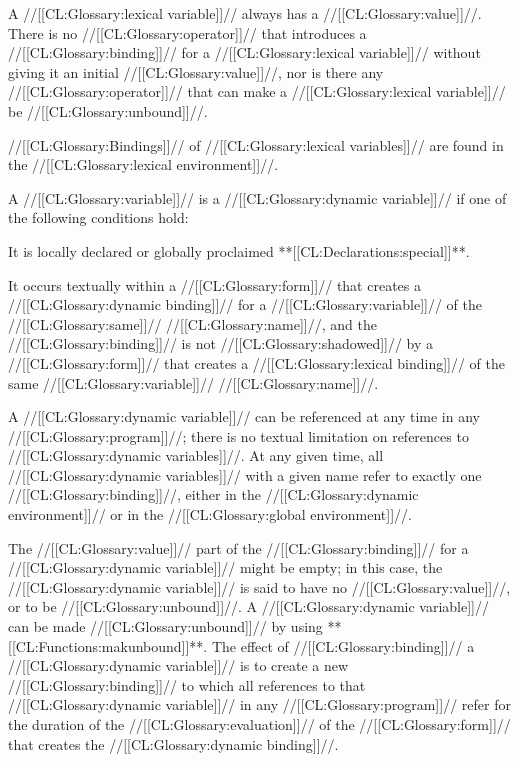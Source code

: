 A //[[CL:Glossary:lexical variable]]// always has a //[[CL:Glossary:value]]//. There is no //[[CL:Glossary:operator]]// that introduces a //[[CL:Glossary:binding]]// for a //[[CL:Glossary:lexical variable]]// without giving it an initial //[[CL:Glossary:value]]//, nor is there any //[[CL:Glossary:operator]]// that can make a //[[CL:Glossary:lexical variable]]// be //[[CL:Glossary:unbound]]//.

//[[CL:Glossary:Bindings]]// of //[[CL:Glossary:lexical variables]]// are found in the //[[CL:Glossary:lexical environment]]//.

\endsubsubsubsubsection%


A //[[CL:Glossary:variable]]// is a //[[CL:Glossary:dynamic variable]]// if one of the following conditions hold:

\beginlist

 \item{\bull} It is locally declared or globally proclaimed **[[CL:Declarations:special]]**.

 \item{\bull} It occurs textually within a //[[CL:Glossary:form]]// that creates a //[[CL:Glossary:dynamic binding]]// for a //[[CL:Glossary:variable]]// of the //[[CL:Glossary:same]]// //[[CL:Glossary:name]]//, and the //[[CL:Glossary:binding]]// is not //[[CL:Glossary:shadowed]]// by a //[[CL:Glossary:form]]// that creates a //[[CL:Glossary:lexical binding]]// of the same //[[CL:Glossary:variable]]// //[[CL:Glossary:name]]//.

\endlist

A //[[CL:Glossary:dynamic variable]]// can be referenced at any time in any //[[CL:Glossary:program]]//; there is no textual limitation on references to //[[CL:Glossary:dynamic variables]]//. At any given time, all //[[CL:Glossary:dynamic variables]]// with a given name refer to  exactly one //[[CL:Glossary:binding]]//, either in the //[[CL:Glossary:dynamic environment]]// or in the //[[CL:Glossary:global environment]]//.

The //[[CL:Glossary:value]]// part of the //[[CL:Glossary:binding]]// for a //[[CL:Glossary:dynamic variable]]// might be empty; in this case, the //[[CL:Glossary:dynamic variable]]// is said to have no //[[CL:Glossary:value]]//, or to be //[[CL:Glossary:unbound]]//.  A //[[CL:Glossary:dynamic variable]]// can be made //[[CL:Glossary:unbound]]// by using **[[CL:Functions:makunbound]]**.
            The effect of //[[CL:Glossary:binding]]// a //[[CL:Glossary:dynamic variable]]// is to create a new //[[CL:Glossary:binding]]// to which all references to that //[[CL:Glossary:dynamic variable]]// in any //[[CL:Glossary:program]]// refer for the duration of the //[[CL:Glossary:evaluation]]// of the //[[CL:Glossary:form]]// that creates the //[[CL:Glossary:dynamic binding]]//.

